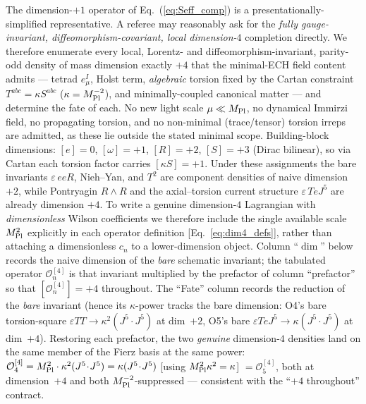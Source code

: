 \documentclass[aps,prd,twocolumn,superscriptaddress,showpacs,preprintnumbers,nofootinbib,longbibliography,floatfix]{revtex4-2}
\newcommand{\MPl}{M_{\rm Pl}}
\begin{document}
The dimension-$+1$ operator of Eq.~(\ref{eq:Seff_comp}) is a
presentationally-simplified representative. A referee may reasonably ask
for the \emph{fully gauge-invariant, diffeomorphism-covariant, local
dimension-$4$} completion directly. We therefore enumerate every local,
Lorentz- and diffeomorphism-invariant, parity-odd density of mass
dimension exactly $+4$ that the minimal-ECH field content admits ---
tetrad $e^I_\mu$, Holst term, \emph{algebraic} torsion fixed by the
Cartan constraint $T^{abc}=\kappa S^{abc}$ ($\kappa=\MPl^{-2}$), and
minimally-coupled canonical matter --- and determine the fate of each.
No new light scale $\mu\ll\MPl$, no dynamical Immirzi field, no
propagating torsion, and no non-minimal (trace/tensor) torsion irreps are
admitted, as these lie outside the stated minimal scope. Building-block
dimensions: $[e]=0$, $[\omega]=+1$, $[R]=+2$, $[S]=+3$ (Dirac bilinear),
so via Cartan each torsion factor carries $[\kappa S]=+1$. Under these
assignments the bare invariants $\varepsilon\,eeR$, Nieh--Yan, and $T^2$ are
component densities of naive dimension $+2$, while Pontryagin $R\wedge R$ and
the axial--torsion current structure $\varepsilon\,TeJ^5$ are already
dimension $+4$. To write a genuine dimension-$4$ Lagrangian with
\emph{dimensionless} Wilson coefficients we therefore include the single
available scale $\MPl^{2}$ explicitly in each operator definition
[Eq.~\eqref{eq:dim4_defs}], rather than attaching a dimensionless $c_n$ to a
lower-dimension object. Column ``$\dim$'' below records the naive dimension of
the \emph{bare} schematic invariant; the tabulated operator
$\mathcal{O}_n^{[4]}$ is that invariant multiplied by the prefactor of
column ``prefactor'' so that $[\mathcal{O}_n^{[4]}]=+4$ throughout. The
``Fate'' column records the reduction of the \emph{bare} invariant (hence its
$\kappa$-power tracks the bare dimension: O4's bare torsion-square
$\varepsilon T T\to\kappa^2(J^5\!\cdot\!J^5)$ at dim~$+2$, O5's bare
$\varepsilon T e J^5\to\kappa(J^5\!\cdot\!J^5)$ at dim~$+4$). Restoring each
prefactor, the two \emph{genuine} dimension-$4$ densities land on the same
member of the Fierz basis at the same power: $\mathcal{O}_4^{[4]}=\MPl^2\cdot
\kappa^2(J^5\!\cdot\!J^5)=\kappa(J^5\!\cdot\!J^5)$ [using $\MPl^2\kappa^2=\kappa$]
$=\mathcal{O}_5^{[4]}$, both at dimension~$+4$ and both
$\MPl^{-2}$-suppressed --- consistent with the ``$+4$ throughout'' contract.
\end{document}
